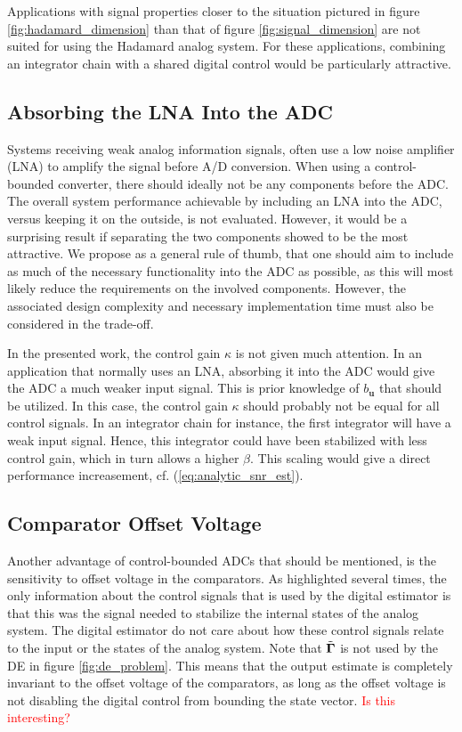 Applications with signal properties closer to the situation pictured in figure \ref{fig:hadamard_dimension} than that of figure \ref{fig:signal_dimension} are not suited for using the Hadamard analog system. For these applications, combining an integrator chain with a shared digital control would be particularly attractive.






\subsection{Absorbing the LNA Into the ADC}
Systems receiving weak analog information signals, often use a low noise amplifier (LNA) to amplify the signal before A/D conversion. When using a control-bounded converter, there should ideally not be any components before the ADC. The overall system performance achievable by including an LNA into the ADC, versus keeping it on the outside, is not evaluated. However, it would be a surprising result if separating the two components showed to be the most attractive. We propose as a general rule of thumb, that one should aim to include as much of the necessary functionality into the ADC as possible, as this will most likely reduce the requirements on the involved components. However, the associated design complexity and necessary implementation time must also be considered in the trade-off.

In the presented work, the control gain $\kappa$ is not given much attention. In an application that normally uses an LNA, absorbing it into the ADC would give the ADC a much weaker input signal. This is prior knowledge of $b_{\bm{u}}$ that should be utilized. In this case, the control gain $\kappa$ should probably not be equal for all control signals. In an integrator chain for instance, the first integrator will have a weak input signal. Hence, this integrator could have been stabilized with less control gain, which in turn allows a higher $\beta$. This scaling would give a direct performance increasement, cf. (\ref{eq:analytic_snr_est}).





\subsection{Comparator Offset Voltage}
Another advantage of control-bounded ADCs that should be mentioned, is the sensitivity to offset voltage in the comparators. As highlighted several times, the only information about the control signals that is used by the digital estimator is that this was the signal needed to stabilize the internal states of the analog system. The digital estimator do not care about how these control signals relate to the input or the states of the analog system. Note that $\tilde{\bm{\Gamma}}$ is not used by the DE in figure \ref{fig:de_problem}. This means that the output estimate is completely invariant to the offset voltage of the comparators, as long as the offset voltage is not disabling the digital control from bounding the state vector.
\textcolor{red}{Is this interesting?}





